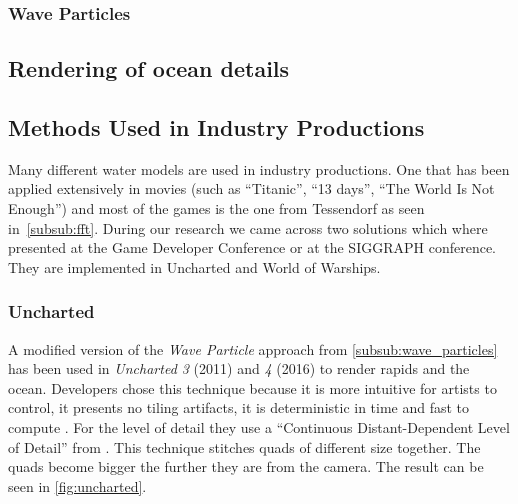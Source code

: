 \subsubsection{Wave Particles}\label{subsub:wave_particles}

\subsection{Rendering of ocean details}\label{subsec:ocean_details}

\subsection{Methods Used in Industry Productions}\label{subsec:methods_industry}


Many different water models are used in industry productions. One that has been
applied extensively in movies (such as ``Titanic'', ``13 days'', ``The World Is
Not Enough'') and most of the games is the one from Tessendorf
\autocite{tessendorf2001simulating} as seen in~\ref{subsub:fft}.  During our
research we came across two solutions which where presented at the Game
Developer Conference or at the SIGGRAPH conference. They are implemented in
Uncharted and World of Warships.

\subsubsection{Uncharted}\label{subsub:uncharted}

A modified version of the \textit{Wave Particle} approach from
\autoref{subsub:wave_particles} has been used in \textit{Uncharted 3} (2011) and
\textit{4} (2016) to render rapids and the ocean. Developers chose this
technique because it is more intuitive for artists to control, it presents no
tiling artifacts, it is deterministic in time and fast to compute
\autocite{gonzalez2012water}. For the level of detail they use a ``Continuous
Distant-Dependent Level of Detail'' from \autocite{strugar2009continuous}. This
technique stitches quads of different size together. The quads become bigger the
further they are from the camera. The result can be seen in
\autoref{fig:uncharted}.

